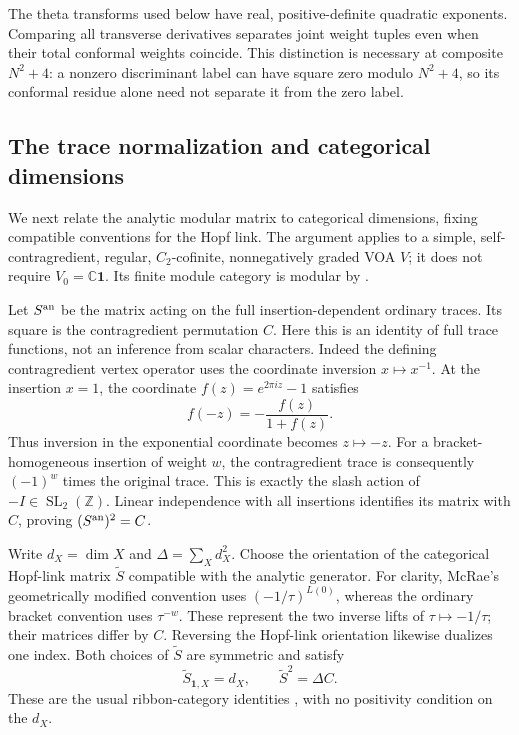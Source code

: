 \documentclass[11pt,a4paper]{article}
\numberwithin{equation}{section}
\theoremstyle{definition}\newtheorem{definition}[theorem]{Definition}
\theoremstyle{remark}\newtheorem{remark}[theorem]{Remark}
\begin{document}
The theta transforms used below have real, positive-definite
quadratic exponents.  Comparing all transverse derivatives
separates joint weight tuples even when their total conformal
weights coincide.  This distinction is necessary at composite
$N^2+4$: a nonzero discriminant label can have square zero
modulo $N^2+4$, so its conformal residue alone need not separate
it from the zero label.


\subsection{The trace normalization and categorical dimensions}
\label{sec:analytic-normalization}

We next relate the analytic modular matrix to categorical dimensions,
fixing compatible conventions for the Hopf link.  The argument applies
to a simple, self-contragredient,
regular, $C_2$-cofinite, nonnegatively graded VOA $V$; it does not require
$V_0=\mathbb C\mathbf1$. Its finite module category is modular by
\cite[Corollary 5.19]{mcrae}.

Let $S^{\rm an}$ be the matrix acting on the full insertion-dependent
ordinary traces. Its square is the contragredient permutation $C$.
Here this is an identity of full trace functions, not an inference from
scalar characters. Indeed the defining contragredient vertex operator
uses the coordinate inversion $x\mapsto x^{-1}$. At the insertion
$x=1$, the coordinate $f(z)=e^{2\pi iz}-1$ satisfies
\[
 f(-z)=-\frac{f(z)}{1+f(z)}.
\]
Thus inversion in the exponential coordinate becomes $z\mapsto-z$.
For a bracket-homogeneous insertion of weight $w$, the contragredient
trace is consequently $(-1)^w$ times the original trace. This is
exactly the slash action of $-I\in\operatorname{SL}_2(\mathbb Z)$.
Linear independence with all insertions identifies its matrix with
$C$, proving $(S^{\rm an})^2=C$.

Write $d_X=\dim X$ and $\Delta=\sum_Xd_X^2$.
Choose the orientation of the categorical Hopf-link matrix
$\widetilde S$ compatible with the analytic generator. For clarity,
McRae's geometrically modified convention uses
$(-1/\tau)^{L(0)}$, whereas the ordinary bracket convention uses
$\tau^{-w}$. These represent the two inverse lifts of
$\tau\mapsto-1/\tau$; their matrices differ by $C$.
Reversing the Hopf-link orientation likewise dualizes one index.
Both choices of $\widetilde S$ are symmetric and satisfy
\[
 \widetilde S_{\mathbf1,X}=d_X,\qquad
 \widetilde S^2=\Delta C.
\]
These are the usual ribbon-category identities
\cite[Section 4]{ko}, with no positivity condition on the $d_X$.
\end{document}
